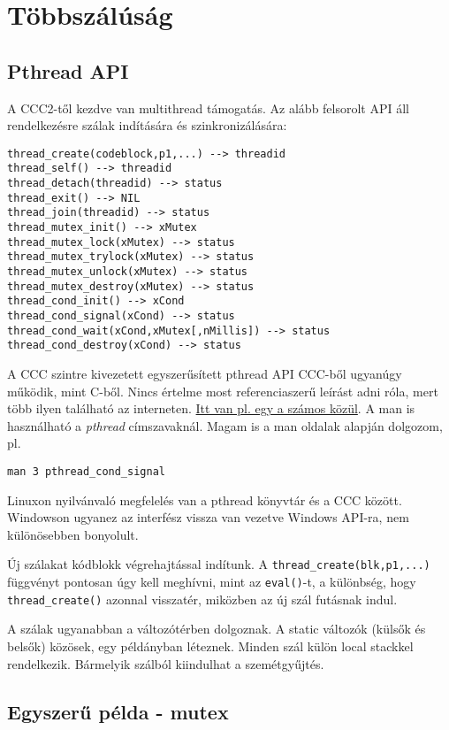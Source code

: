 \section{Többszálúság}

\subsection{Pthread API}

A CCC2-től kezdve van multithread támogatás.
Az alább felsorolt API áll rendelkezésre
szálak indítására és szinkronizálására:
\begin{verbatim}
thread_create(codeblock,p1,...) --> threadid
thread_self() --> threadid 
thread_detach(threadid) --> status
thread_exit() --> NIL
thread_join(threadid) --> status
thread_mutex_init() --> xMutex
thread_mutex_lock(xMutex) --> status
thread_mutex_trylock(xMutex) --> status 
thread_mutex_unlock(xMutex) --> status 
thread_mutex_destroy(xMutex) --> status 
thread_cond_init() --> xCond
thread_cond_signal(xCond) --> status
thread_cond_wait(xCond,xMutex[,nMillis]) --> status 
thread_cond_destroy(xCond) --> status
\end{verbatim}

A CCC szintre kivezetett egyszerűsített pthread API CCC-ből ugyanúgy működik, 
mint C-ből. Nincs értelme most referenciaszerű leírást adni róla, mert több
ilyen található az interneten. 
\href{http://cs.pub.ro/~apc/2003/resources/pthreads/uguide/document.htm}%
{Itt van pl. egy a számos közül}.
A  man is használható a {\em pthread\/}  címszavaknál. 
Magam is a man oldalak alapján dolgozom, pl.
\begin{verbatim}
man 3 pthread_cond_signal
\end{verbatim}
Linuxon nyilvánvaló megfelelés van a pthread könyvtár és a CCC között.
Windowson ugyanez az interfész vissza van vezetve Windows API-ra, 
nem különösebben bonyolult.


Új szálakat  kódblokk végrehajtással indítunk.
A \verb!thread_create(blk,p1,...)! függvényt pontosan úgy kell meghívni, 
mint az \verb!eval()!-t, a különbség, hogy \verb!thread_create()! azonnal visszatér,
miközben az új szál futásnak indul.

A szálak ugyanabban a változótérben dolgoznak. A static változók (külsők és belsők) 
közösek, egy példányban léteznek. Minden szál külön local stackkel rendelkezik.
Bármelyik szálból kiindulhat a szemétgyűjtés.


\subsection{Egyszerű példa - mutex}

